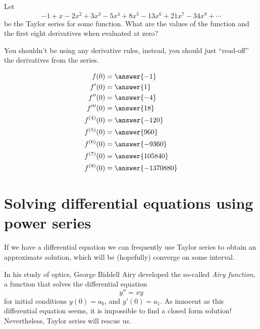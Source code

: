 \documentclass{ximera}
\begin{document}
\begin{question}
  Let
  \[
  -1 + x - 2x^2 + 3x^3 - 5x^4 + 8x^5-13x^6+21x^7 -34x^8 + \cdots  
  \]
  be the Taylor series for some function. What are the values of the
  function and the first eight derivatives when evaluated at zero?
  \begin{hint}
    You shouldn't be using any derivative rules, instead, you should
    just ``read-off'' the derivatives from the series.
  \end{hint}
  \begin{prompt}
    \begin{align*}
      f(0) &= \answer{-1}\\
      f'(0) &= \answer{1}\\
      f''(0) &= \answer{-4}\\
      f'''(0) &= \answer{18}\\
      f^{(4)}(0) &= \answer{-120}\\
      f^{(5)}(0) &= \answer{960}\\
      f^{(6)}(0) &= \answer{-9360}\\
      f^{(7)}(0) &= \answer{105840}\\
      f^{(8)}(0) &= \answer{-1370880}
    \end{align*}
  \end{prompt}
\end{question}




\section{Solving differential equations using power series}

If we have a differential equation we can frequently use Taylor series
to obtain an approximate solution, which will be (hopefully) converge
on some interval.

In his study of optics, George Biddell Airy developed the so-called
\textit{Airy function}, a function that solves the differential
equation
\[
y'' = xy
\]
for initial conditions $y(0) = a_0$, and $y'(0) = a_1$.  As innocent as
this differential equation seems, it is impossible to find a closed
form solution! Nevertheless, Taylor series will rescue us.
\end{document}
